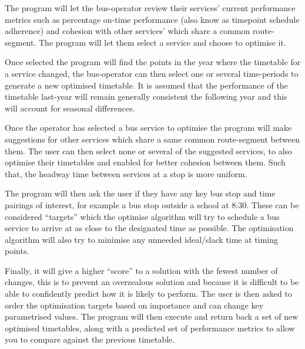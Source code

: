 \documentclass{article}
\begin{document}
\par
The program will let the bus-operator review their services' current performance metrics such as percentage on-time performance (also know as timepoint schedule adherence) and cohesion with other services' which share a common route-segment. The program will let them select a service and choose to optimise it.
\par
Once selected the program will find the points in the year where the timetable for a service changed, the bus-operator can then select one or several time-periods to generate a new optimised timetable. It is assumed that the performance of the timetable last-year will remain generally consistent the following year and this will account for seasonal differences. 
\par 
Once the operator has selected a bus service to optimise the program will make suggestions for other services which share a same common route-segment between them. The user can then select none or several of the suggested services, to also optimise their timetables and enabled for better cohesion between them. Such that, the headway time between services at a stop is more uniform. 
\par 
The program will then ask the user if they have any key bus stop and time pairings of interest, for example a bus stop outside a school at 8:30. These can be considered “targets” which the optimise algorithm will try to schedule a bus service to arrive at as close to the designated time as possible. The optimisation algorithm will also try to minimise any unneeded ideal/slack time at timing points. 

\par
Finally, it will give a higher ``score'' to a solution with the fewest number of changes, this is to prevent an overzealous solution and because it is difficult to be able to confidently predict how it is likely to perform. The user is then asked to order the optimisation targets based on importance and can change key parametrised values. The program will then execute and return back a set of new optimised timetables, along with a predicted set of performance metrics to allow you to compare against the previous timetable.
\end{document}
